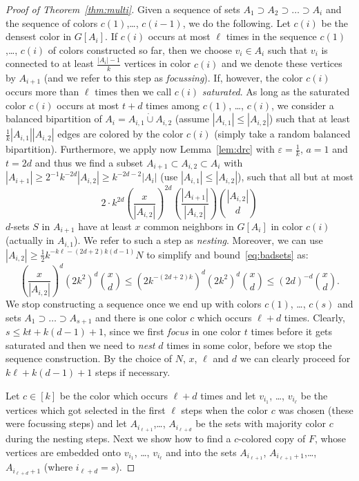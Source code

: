 \documentclass[reqno]{amsart}
\theoremstyle{remark}
\newcommand{\eps}{\varepsilon}
\newcommand{\dcup}{\dot{\cup}}
\begin{document}
\begin{proof}[Proof of Theorem~\ref{thm:multi}]
Given a sequence of sets $A_1\supset A_2\supset \ldots\supset A_{i}$ and the sequence of colors %
$c(1)$,\ldots, $c(i-1)$, we do the following. Let $c(i)$ be the densest color in $G[A_{i}]$. 
If $c(i)$ occurs at most $\ell$ times in the sequence 
$c(1)$,\ldots, $c(i)$ of colors constructed so far, 
then we choose $v_{i}\in A_{i}$ such that $v_{i}$ is connected to at least $\tfrac{|A_{i}|-1}{k}$ vertices 
in color $c(i)$ and we denote these vertices by $A_{i+1}$ (and we refer to this step as \emph{focussing}). 
If, however, the color $c(i)$ occurs more than $\ell$ times then we call $c(i)$ \emph{saturated}. 
As long as the saturated color $c(i)$ occurs at most  $t+d$ times among $c(1)$, \ldots, $c(i)$, 
 we consider a balanced bipartition of $A_{i}=A_{i,1}\dcup A_{i,2}$ (assume $|A_{i,1}|\le |A_{i,2}|$) such that 
at least $\tfrac{1}{k}|A_{i,1}||A_{i,2}|$ edges are colored by the color $c(i)$ (simply take a random balanced bipartition). 
Furthermore, we apply now Lemma~\ref{lem:drc} with $\eps=\tfrac{1}{k}$, 
$a=1$ and $t=2d$ and thus we find a subset $A_{i+1}\subset A_{i,2}\subset A_i$ with $|A_{i+1}|\ge 2^{-1} k^{-2d} |A_{i,2}|\ge k^{-2d-2}|A_i|$ (use $|A_{i,1}|\le |A_{i,2}|$),
 such that  all but at most 
\begin{equation}\label{eq:badsets}
 2 \cdot k^{2d} \left( \frac{x}{|A_{i,2}|} \right)^{2d} \left(\frac{|A_{i+1}|}{|A_{i,2}|} \right) \binom{|A_{i,2}|}{d}
\end{equation}
$d$-sets $S$ in $A_{i+1}$ have at least $x$ common neighbors in $G[A_i]$ in color $c(i)$ (actually in $A_{i,1}$). We refer to  such a step as \emph{nesting}. 
Moreover, we can use $|A_{i,2}|\ge \tfrac{1}{2}k^{-k\ell-(2d+2)k(d-1)} N$ to simplify and  bound~\eqref{eq:badsets} as: 
\[
 \left(\frac{x}{|A_{i,2}|}\right)^d (2k^2)^d  \binom{x}{d} \le \left(2 k^{-(2d+2)k}\right)^d (2k^2)^d  \binom{x}{d} \le (2d)^{-d} \binom{x}{d}.
\]
We stop constructing a sequence once we end up with colors $c(1)$, \ldots, $c(s)$ and sets 
$A_1\supset\ldots\supset A_{s+1}$ and there is one color $c$ which occurs 
$\ell+d$ times. Clearly, $s\le kt+k(d-1)+1$, since we first \emph{focus} in one color $t$ times before it gets saturated and then we need to \emph{nest} $d$ times in some color, 
before we stop the sequence construction. By the choice of  $N$, $x$, $\ell$ and $d$ we can clearly proceed for $k\ell+ k (d-1)+1$ steps if necessary. 

Let $c\in[k]$ be the color which occurs $\ell+d$ times and let $v_{i_1}$, \ldots, $v_{i_\ell}$ be the vertices 
which got selected in the first $\ell$ steps when the color $c$ was chosen (these were focussing steps) and 
let $A_{i_{\ell+1}}$,\ldots, $A_{i_{\ell+d}}$ be the sets with majority color $c$ during the nesting steps.  
Next we show how to find a $c$-colored copy of $F$, whose vertices are embedded onto $v_{i_1}$, \ldots, $v_{i_\ell}$ and 
into the sets  $A_{i_{\ell+1}}$, $A_{i_{\ell+1}+1}$,\ldots, $A_{i_{\ell+d}+1}$ (where $i_{\ell+d}=s$). 


\end{proof}
\end{document}
